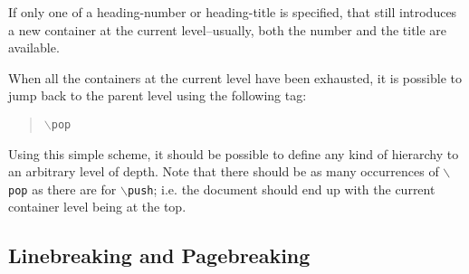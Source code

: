 \documentclass[11pt]{article}
\newcommand{\cmd}[1]{{\tt $\backslash$#1}}
\begin{document}
\noindent If only one of a heading-number or heading-title is
specified, that still introduces a new container at the current
level--usually, both the number and the title are available.

When all the containers at the current level have been
exhausted, it is possible to jump back to the parent level using the
following tag:

\begin{quote}
  \cmd{pop}
\end{quote}

Using this simple scheme, it should be possible to define any kind of
hierarchy to an arbitrary level of depth. Note that there should be as
many occurrences of \cmd{pop} as there are for \cmd{push}; i.e. the
document should end up with the current container level being at the
top.

\subsection{Linebreaking and Pagebreaking}





\end{document}
